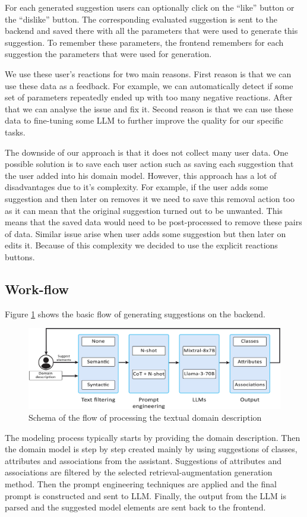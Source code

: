 For each generated suggestion users can optionally click on the ``like'' button or the ``dislike'' button. The corresponding evaluated suggestion is sent to the backend and saved there with all the parameters that were used to generate this suggestion. To remember these parameters, the frontend remembers for each suggestion the parameters that were used for generation.

We use these user's reactions for two main reasons. First reason is that we can use these data as a feedback. For example, we can automatically detect if some set of parameters repeatedly ended up with too many negative reactions. After that we can analyse the issue and fix it. Second reason is that we can use these data to fine-tuning some LLM to further improve the quality for our specific tasks.

The downside of our approach is that it does not collect many user data. One possible solution is to save each user action such as saving each suggestion that the user added into his domain model. However, this approach has a lot of disadvantages due to it's complexity. For example, if the user adds some suggestion and then later on removes it we need to save this removal action too as it can mean that the original suggestion turned out to be unwanted. This means that the saved data would need to be post-processed to remove these pairs of data. Similar issue arise when user adds some suggestion but then later on edits it. Because of this complexity we decided to use the explicit reactions buttons.


\subsection{Work-flow}

Figure \ref{fig:work-flow} shows the basic flow of generating suggestions on the backend.

\begin{figure}[!h]
    \centering
    \includegraphics[scale=0.23]{img/work-flow.jpg}
    \caption{\centering Schema of the flow of processing the textual domain description}
    \label{fig:work-flow}
\end{figure}

The modeling process typically starts by providing the domain description. Then the domain model is step by step created mainly by using suggestions of classes, attributes and associations from the assistant. Suggestions of attributes and associations are filtered by the selected retrieval-augmentation generation method. Then the prompt engineering techniques are applied and the final prompt is constructed and sent to LLM. Finally, the output from the LLM is parsed and the suggested model elements are sent back to the frontend.
